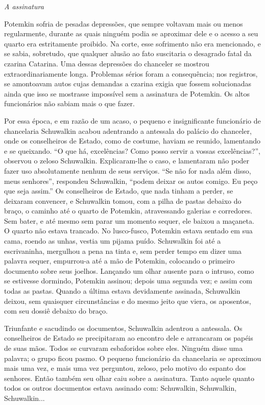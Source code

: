 \emph{A assinatura }

Potemkin sofria de pesadas depressões, que sempre voltavam mais ou menos
regularmente, durante as quais ninguém podia se aproximar dele e o
acesso a seu quarto era estritamente proibido. Na corte, esse sofrimento
não era mencionado, e se sabia, sobretudo, que qualquer alusão ao fato
suscitaria o desagrado fatal da czarina Catarina. Uma dessas depressões
do chanceler se mostrou extraordinariamente longa. Problemas sérios
foram a consequência; nos registros, se amontoavam autos cujas demandas
a czarina exigia que fossem solucionadas ainda que isso se mostrasse
impossível sem a assinatura de Potemkin. Os altos funcionários não
sabiam mais o que fazer.

Por essa época, e em razão de um acaso, o pequeno e insignificante
funcionário de chancelaria Schuwalkin acabou adentrando a antessala do
palácio do chanceler, onde os conselheiros de Estado, como de costume,
haviam se reunido, lamentando e se queixando. ``O que há, excelências?
Como posso servir a vossas excelências?'', observou o zeloso Schuwalkin.
Explicaram-lhe o caso, e lamentaram não poder fazer uso absolutamente
nenhum de seus serviços. ``Se não for nada além disso, meus senhores'',
respondeu Schuwalkin, ``podem deixar os autos comigo. Eu peço que seja
assim.'' Os conselheiros de Estado, que nada tinham a perder, se
deixaram convencer, e Schuwalkin tomou, com a pilha de pastas debaixo do
braço, o caminho até o quarto de Potemkin, atravessando galerias e
corredores. Sem bater, e até mesmo sem parar um momento sequer, ele
baixou a maçaneta. O quarto não estava trancado. No lusco-fusco,
Potemkin estava sentado em sua cama, roendo as unhas, vestia um pijama
puído. Schuwalkin foi até a escrivaninha, mergulhou a pena na tinta e,
sem perder tempo em dizer uma palavra sequer, empurrou-a até a mão de
Potemkin, colocando o primeiro documento sobre seus joelhos. Lançando um
olhar ausente para o intruso, como se estivesse dormindo, Potemkin
assinou; depois uma segunda vez; e assim com todas as pastas. Quando a
última estava devidamente assinada, Schuwalkin deixou, sem quaisquer
circunstâncias e do mesmo jeito que viera, os aposentos, com seu dossiê
debaixo do braço.

Triunfante e sacudindo os documentos, Schuwalkin adentrou a antessala.
Os conselheiros de Estado se precipitaram ao encontro dele e arrancaram
os papéis de suas mãos. Todos se curvaram esbaforidos sobre eles.
Ninguém disse uma palavra; o grupo ficou pasmo. O pequeno funcionário da
chancelaria se aproximou mais uma vez, e mais uma vez perguntou, zeloso,
pelo motivo do espanto dos senhores. Então também seu olhar caiu sobre a
assinatura. Tanto aquele quanto todos os outros documentos estava
assinado com: Schuwalkin, Schuwalkin, Schuwalkin...

